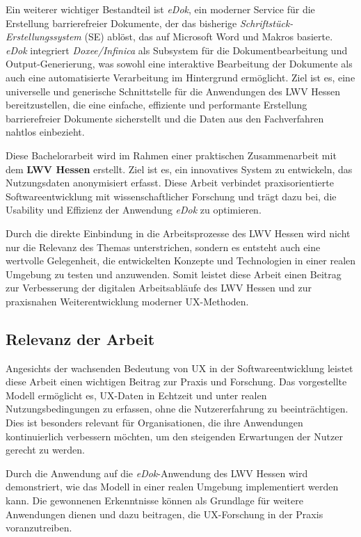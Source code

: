\documentclass[12pt,oneside]{article}
\begin{document}
Ein weiterer wichtiger Bestandteil ist \textit{eDok}, ein moderner Service für die Erstellung barrierefreier Dokumente, der das bisherige \textit{Schriftstück-Erstellungssystem} (SE) ablöst, das auf Microsoft Word und Makros basierte. \textit{eDok} integriert \textit{Doxee/Infinica} als Subsystem für die Dokumentbearbeitung und Output-Generierung, was sowohl eine interaktive Bearbeitung der Dokumente als auch eine automatisierte Verarbeitung im Hintergrund ermöglicht. Ziel ist es, eine universelle und generische Schnittstelle für die Anwendungen des LWV Hessen bereitzustellen, die eine einfache, effiziente und performante Erstellung barrierefreier Dokumente sicherstellt und die Daten aus den Fachverfahren nahtlos einbezieht.

Diese Bachelorarbeit wird im Rahmen einer praktischen Zusammenarbeit mit dem \textbf{LWV Hessen} erstellt. Ziel ist es, ein innovatives System zu entwickeln, das Nutzungsdaten anonymisiert erfasst.
Diese Arbeit verbindet praxisorientierte Softwareentwicklung mit wissenschaftlicher Forschung und trägt dazu bei, die Usability und Effizienz der Anwendung \textit{eDok} zu optimieren.

Durch die direkte Einbindung in die Arbeitsprozesse des LWV Hessen wird nicht nur die Relevanz des Themas unterstrichen, sondern es entsteht auch eine wertvolle Gelegenheit, die entwickelten Konzepte und Technologien in einer realen Umgebung zu testen und anzuwenden. Somit leistet diese Arbeit einen Beitrag zur Verbesserung der digitalen Arbeitsabläufe des LWV Hessen und zur praxisnahen Weiterentwicklung moderner UX-Methoden.
\subsection{Relevanz der Arbeit}

Angesichts der wachsenden Bedeutung von UX in der Softwareentwicklung leistet diese Arbeit einen wichtigen Beitrag zur Praxis und Forschung. Das vorgestellte Modell ermöglicht es, UX-Daten in Echtzeit und unter realen Nutzungsbedingungen zu erfassen, ohne die Nutzererfahrung zu beeinträchtigen. Dies ist besonders relevant für Organisationen, die ihre Anwendungen kontinuierlich verbessern möchten, um den steigenden Erwartungen der Nutzer gerecht zu werden.

Durch die Anwendung auf die \textit{eDok}-Anwendung des LWV Hessen wird demonstriert, wie das Modell in einer realen Umgebung implementiert werden kann. Die gewonnenen Erkenntnisse können als Grundlage für weitere Anwendungen dienen und dazu beitragen, die UX-Forschung in der Praxis voranzutreiben.
\end{document}
